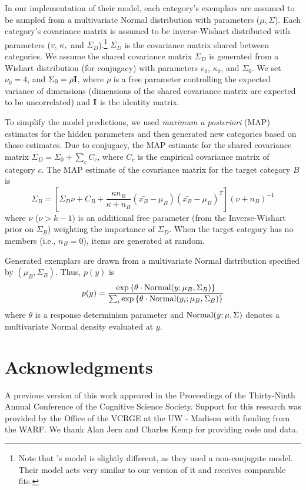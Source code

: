 \documentclass[12pt]{article}
\newcommand\nbcnote[1]{\todo[inline, backgroundcolor = yellow]{\textbf{NBC}: #1}}
\begin{document}
\begin{flushleft}
In our implementation of their model, each category's exemplars are assumed to be sampled from a multivariate Normal distribution with parameters ($\mu, \Sigma$). Each category's covariance matrix is assumed to be inverse-Wishart distributed with parameters ($v$, $\kappa,$ and $\Sigma_D$).\footnote{Note that \citet{jern2013probabilistic}'s model is slightly different, as they used a non-conjugate model. Their model acts very similar to our version of it and receives comparable fits.} $\Sigma_D$ is the covariance matrix shared between categories. We assume the shared covariance matrix $\Sigma_D$ is generated from a Wishart distribution (for conjugacy) with parameters $v_0$, $\kappa_0$, and $\Sigma_0$. We set $\nu_0 = 4$, and $\Sigma_0 = \rho {\bf I}$, where $\rho$ is a free parameter controlling the expected variance of dimensions (dimensions of the shared covariance matrix are expected to be uncorrelated) and ${\bf I}$ is the identity matrix.

\nbcnote{check on that $\nu_0 = 4$ business}

To simplify the model predictions, we used {\em maximum a posteriori} (MAP) estimates for the hidden parameters and then generated new categories based on those estimates. Due to conjugacy, the MAP estimate for the shared covariance matrix $\Sigma_D = \Sigma_0 + \sum_c{C_c}$, where $C_c$ is the empirical covariance matrix of category $c$. The MAP estimate of the covariance matrix for the target category $B$ is 
\begin{equation}
  \Sigma_B = \left[ \Sigma_D \nu + C_B +
    \dfrac
    {\kappa n_B}
    {\kappa + n_B}
    (\bar{x_B}-\mu_B)(\bar{x_B}-\mu_B)^T
  \right] (\nu + n_B)^{-1}
  \label{eq:Sigma_B}
\end{equation}
%
where $\nu$ ($\nu>k-1$) is an additional free parameter (from the Inverse-Wishart prior on $\Sigma_B$) weighting the importance of $\Sigma_{D}$. When the target category has no members (i.e., $n_B = 0$), items are generated at random.

Generated exemplars are drawn from a multivariate Normal distribution specified by $(\mu_{B}, \Sigma_{B})$. Thus, $p(y)$ is
\begin{equation}
  p(y) = \dfrac
    {\exp \left \{ \theta \cdot {\rm Normal}(y; \mu_{B}, \Sigma_{B}) \right \} }
    {\sum_i \exp \left \{ \theta \cdot {\rm Normal}(y_i; \mu_{B}, \Sigma_{B}) \right \} } 
\end{equation}
where $\theta$ is a response determinism parameter and ${\rm Normal}(y; \mu, \Sigma)$ denotes a multivariate Normal density evaluated at $y$. 


\section{Acknowledgments}
A previous version of this work appeared in the Proceedings of the Thirty-Ninth Annual Conference of the Cognitive Science Society. Support for this research was provided by the Office of the VCRGE at the UW - Madison with funding from the WARF. We thank Alan Jern and Charles Kemp for providing code and data.



\end{flushleft}


\clearpage


\clearpage
\end{document}

